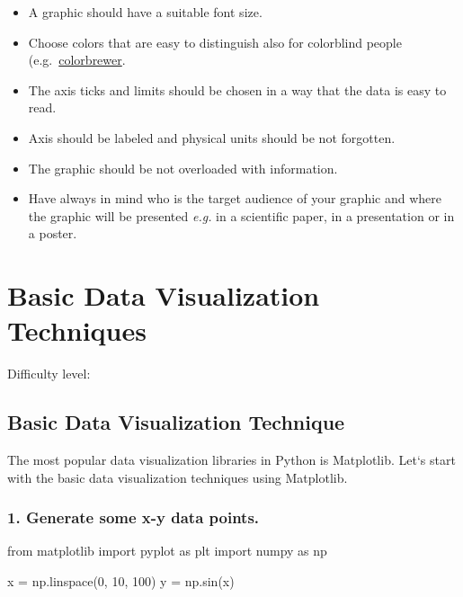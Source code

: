 \documentclass[
  letterpaper,
  DIV=11,
  numbers=noendperiod]{scrreprt}
\newenvironment{Shaded}{\begin{snugshade}}{\end{snugshade}}
\newcommand{\DecValTok}[1]{\textcolor[rgb]{0.68,0.00,0.00}{#1}}
\newcommand{\ImportTok}[1]{\textcolor[rgb]{0.00,0.46,0.62}{#1}}
\newcommand{\NormalTok}[1]{\textcolor[rgb]{0.00,0.23,0.31}{#1}}
\newcommand{\OperatorTok}[1]{\textcolor[rgb]{0.37,0.37,0.37}{#1}}
\providecommand{\tightlist}{%
  \setlength{\itemsep}{0pt}\setlength{\parskip}{0pt}}\usepackage{longtable,booktabs,array}
\begin{document}

\begin{itemize}
\tightlist
\item
  A graphic should have a suitable font size.
\item
  Choose colors that are easy to distinguish also for colorblind people
  (e.g.~\href{https://colorbrewer2.org/}{colorbrewer}.
\item
  The axis ticks and limits should be chosen in a way that the data is
  easy to read.
\item
  Axis should be labeled and physical units should be not forgotten.
\item
  The graphic should be not overloaded with information.
\item
  Have always in mind who is the target audience of your graphic and
  where the graphic will be presented \emph{e.g.} in a scientific paper,
  in a presentation or in a poster.
\end{itemize}

\chapter{Basic Data Visualization
Techniques}\label{basic-data-visualization-techniques}

Difficulty level: { }

\section*{Basic Data Visualization
Technique}\label{basic-data-visualization-technique}


The most popular data visualization libraries in Python is Matplotlib.
Let`s start with the basic data visualization techniques using
Matplotlib.

\subsection*{1. Generate some x-y data
points.}\label{generate-some-x-y-data-points.}

\begin{Shaded}
\begin{Highlighting}[]
\ImportTok{from}\NormalTok{ matplotlib }\ImportTok{import}\NormalTok{ pyplot }\ImportTok{as}\NormalTok{ plt}
\ImportTok{import}\NormalTok{ numpy }\ImportTok{as}\NormalTok{ np}

\NormalTok{x }\OperatorTok{=}\NormalTok{ np.linspace(}\DecValTok{0}\NormalTok{, }\DecValTok{10}\NormalTok{, }\DecValTok{100}\NormalTok{)}
\NormalTok{y }\OperatorTok{=}\NormalTok{ np.sin(x)}
\end{Highlighting}
\end{Shaded}
\end{document}

